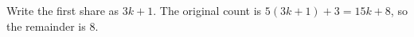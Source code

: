 Write the first share as $3k+1$. The original count is $5(3k+1)+3=15k+8$, so the remainder is $\boxed8$.
